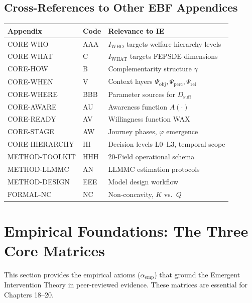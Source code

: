 \subsection{Cross-References to Other EBF Appendices}

\begin{center}
\renewcommand{\arraystretch}{1.2}
\begin{tabular}{@{}llp{7cm}@{}}
\toprule
\textbf{Appendix} & \textbf{Code} & \textbf{Relevance to IE} \\
\midrule
CORE-WHO & AAA & $I_{\text{WHO}}$ targets welfare hierarchy levels \\
CORE-WHAT & C & $I_{\text{WHAT}}$ targets FEPSDE dimensions \\
CORE-HOW & B & Complementarity structure $\gamma$ \\
CORE-WHEN & V & Context layers $\Psi_{\text{obj}}, \Psi_{\text{perc}}, \Psi_{\text{rel}}$ \\
CORE-WHERE & BBB & Parameter sources for $D_{\text{suff}}$ \\
CORE-AWARE & AU & Awareness function $A(\cdot)$ \\
CORE-READY & AV & Willingness function WAX \\
CORE-STAGE & AW & Journey phases, $\varphi$ emergence \\
CORE-HIERARCHY & HI & Decision levels L0--L3, temporal scope \\
\midrule
METHOD-TOOLKIT & HHH & 20-Field operational schema \\
METHOD-LLMMC & AN & LLMMC estimation protocols \\
METHOD-DESIGN & EEE & Model design workflow \\
FORMAL-NC & NC & Non-concavity, $K$ vs.\ $Q$ \\
\bottomrule
\end{tabular}
\end{center}

\section{Empirical Foundations: The Three Core Matrices}
\label{sec:ie-empirical-foundations}

This section provides the empirical axioms ($\alpha_{\text{emp}}$) that ground the Emergent Intervention Theory in peer-reviewed evidence. These matrices are essential for Chapters 18--20.

